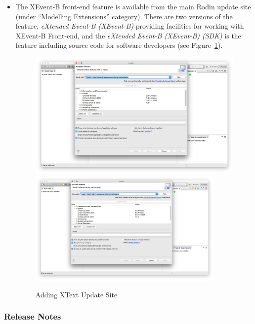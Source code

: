 \begin{itemize}
\item The XEvent-B front-end feature is available from the main Rodin update site (under ``Modelling Extensions'' category). There are two versions of the feature, \emph{eXtended Event-B (XEvent-B)} providing facilities for working with XEvent-B Front-end, and the \emph{eXtended Event-B (XEvent-B) (SDK)} is the feature including source code for software developers (see Figure~\ref{fig:EventBXText-installation}).
\begin{figure}[!htbp]
  \centering
  \ifplastex
  \includegraphics[width=512]{figures/EventBXTextInstallation}
  \else
  \includegraphics[width=0.9\textwidth]{figures/EventBXTextInstallation}
  \fi
  \caption{Adding XText Update Site}
  \label{fig:EventBXText-installation}
\end{figure}

\end{itemize}

\subsubsection{Release Notes}
\label{sec:release-notes}
